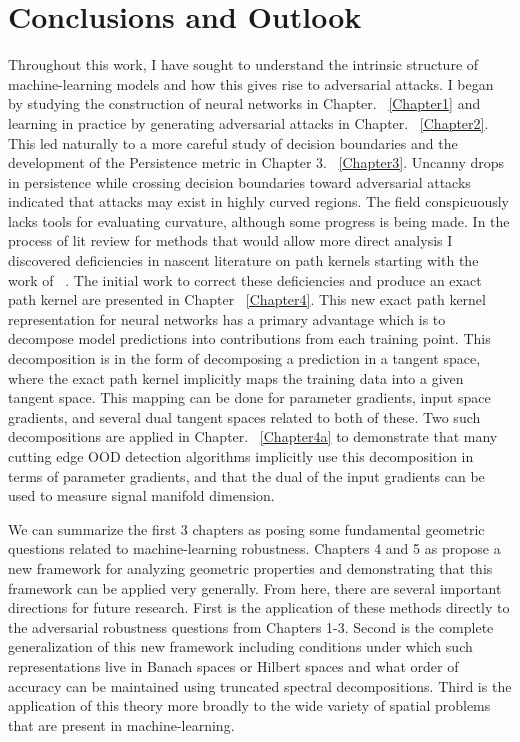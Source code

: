 \chapter{Conclusions and Outlook}

\label{Chapter5} %

Throughout this work, I have sought to understand the intrinsic
structure of machine-learning models and how this gives
rise to adversarial attacks. I began by studying the construction of
neural networks in Chapter. ~\ref{Chapter1} and learning in practice by generating adversarial
attacks in Chapter. ~\ref{Chapter2}. This led naturally to a more careful study of decision
boundaries and the development of the Persistence metric in Chapter
3. ~\ref{Chapter3}. Uncanny drops in persistence while crossing
decision boundaries toward adversarial attacks indicated that attacks
may exist in highly curved regions. The field conspicuously lacks
tools for evaluating curvature, although some progress is being
made. In the process of lit review for methods that would allow more
direct analysis I discovered deficiencies in nascent literature on
path kernels starting with the work of ~\citet{domingos2020}. The
initial work to correct these deficiencies and produce an exact path
kernel are presented in Chapter ~\ref{Chapter4}. This new exact path kernel
representation for neural networks has a primary advantage which is to
decompose model predictions into contributions from each training
point. This decomposition is in the form of decomposing a prediction
in a tangent space, where the exact path kernel implicitly maps the
training data into a given tangent space. This mapping can be done for
parameter gradients, input space gradients, and several dual tangent
spaces related to both of these. Two such decompositions are applied
in Chapter. ~\ref{Chapter4a} to demonstrate that many cutting edge OOD
detection algorithms implicitly use this decomposition in terms of
parameter gradients, and that the dual of the input gradients can be
used to measure signal manifold dimension.

We can summarize the first 3 chapters as posing some fundamental
geometric questions related to machine-learning robustness. 
Chapters 4 and 5 as propose a new framework for analyzing geometric
properties and demonstrating that this framework can be applied very
generally. From here, there are several important directions for
future research. First is the application of these methods directly to
the adversarial robustness questions from Chapters 1-3. Second is the
complete generalization of this new framework including conditions
under which such representations live in Banach spaces or Hilbert
spaces and what order of accuracy can be maintained using truncated
spectral decompositions. Third is the application of this theory more
broadly to the wide variety of spatial problems that are present in
machine-learning. 

